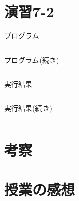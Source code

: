 \documentclass[10pt]{jarticle}
\begin{document}
\newpage

\section{演習7-2}
\begin{itembox}[l]{プログラム}
  \begin{verbatim}
  \end{verbatim}
\end{itembox}

\begin{itembox}[l]{プログラム(続き)}
  \begin{verbatim}
  \end{verbatim}
\end{itembox}

\begin{itembox}[l]{実行結果}
  \begin{verbatim}
  \end{verbatim}
\end{itembox}

\begin{itembox}[l]{実行結果(続き)}
  \begin{verbatim}
  \end{verbatim}
\end{itembox}

\newpage

\section{考察}

\section{授業の感想}
\end{document}
